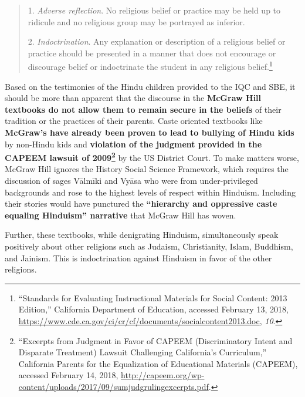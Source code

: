 \begin{quote}
1. \textit{Adverse reflection}. No religious belief or practice may be held up to ridicule and no religious group may be portrayed as inferior.

2. \textit{Indoctrination}. Any explanation or description of a religious belief or practice should be presented in a manner that does not encourage or discourage belief or indoctrinate the student in any religious belief.\footnote{“Standards for Evaluating Instructional Materials for Social Content: 2013 Edition,” California Department of Education, accessed February 13, 2018, \url{https://www.cde.ca.gov/ci/cr/cf/documents/socialcontent2013.doc}, \textit{10}.}
\end{quote}
Based on the testimonies of the Hindu children provided to the IQC and SBE, it should be more than apparent that the discourse in the \textbf{McGraw Hill textbooks do not allow them to remain secure in the beliefs} of their tradition or the practices of their parents. Caste oriented textbooks like \textbf{McGraw’s have already been proven to lead to bullying of Hindu kids} by non-Hindu kids and \textbf{violation of the judgment provided in the CAPEEM lawsuit of 2009\footnote{“Excerpts from Judgment in Favor of CAPEEM (Discriminatory Intent and Disparate Treatment) Lawsuit Challenging California’s Curriculum,” California Parents for the Equalization of Educational Materials (CAPEEM), accessed February 14, 2018, \url{http://capeem.org/wp-content/uploads/2017/09/sumjudgrulingexcerpts.pdf}.}} by the US District Court. To make matters worse, McGraw Hill ignores the History Social Science Framework, which requires the discussion of sages Vālmīki and Vyāsa who were from under-privileged backgrounds and rose to the highest levels of respect within Hinduism. Including their stories would have punctured the \textbf{“hierarchy and oppressive caste equaling Hinduism” narrative} that McGraw Hill has woven.

Further, these textbooks, while denigrating Hinduism, simultaneously speak positively about other religions such as Judaism, Christianity, Islam, Buddhism, and Jainism. This is indoctrination against Hinduism in favor of the other religions.

